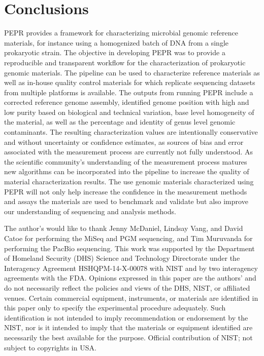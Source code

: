 \documentclass[smallextended]{svjour3}\usepackage[]{graphicx}\usepackage[]{color}
\begin{document}
\section{Conclusions}
PEPR provides a framework for characterizing microbial genomic reference materials, for instance using a homogenized batch of DNA from a single prokaryotic strain. The objective in developing PEPR was to provide a reproducible and transparent workflow for the characterization of prokaryotic genomic materials. The pipeline can be used to characterize reference materials as well as in-house quality control materials for which replicate sequencing datasets from multiple platforms is available. The outputs from running PEPR include a corrected reference genome assembly, identified genome position with high and low purity based on biological and technical variation, base level homogeneity of the material, as well as the percentage and identity of genus level genomic contaminants. The resulting characterization values are intentionally conservative and without uncertainty or confidence estimates, as sources of bias and error associated with the measurement process are currently not fully understood. As the scientific community's understanding of the measurement process matures new algorithms can be incorporated into the pipeline to increase the quality of material characterization results. The use genomic materials characterized using PEPR will not only help increase the confidence in the measurement methods and assays the materials are used to benchmark and validate but also improve our understanding of sequencing and analysis methods.


\begin{acknowledgements}
The author’s would like to thank Jenny McDaniel, Lindsay Vang, and David Catoe for performing the MiSeq and PGM sequencing, and Tim Muruvanda for performing the PacBio sequencing. This work was supported by the Department of Homeland Security (DHS) Science and Technology Directorate under the Interagency Agreement HSHQPM-14-X-00078 with NIST and by two interagency agreements with the FDA. Opinions expressed in this paper are the authors’ and do not necessarily reflect the policies and views of the DHS, NIST, or affiliated venues. Certain commercial equipment, instruments, or materials are identified in this paper only to specify the experimental procedure adequately. Such identification is not intended to imply recommendation or endorsement by the NIST, nor is it intended to imply that the materials or equipment identified are necessarily the best available for the purpose.
Official contribution of NIST; not subject to copyrights in USA.
\end{acknowledgements}

\printbibliography
\end{document}
